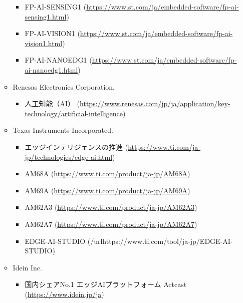 \begin{itemize}
\begin{itemize}
\begin{itemize}
			\item FP-AI-SENSING1 (\url{https://www.st.com/ja/embedded-software/fp-ai-sensing1.html})
			\item FP-AI-VISION1 (\url{https://www.st.com/ja/embedded-software/fp-ai-vision1.html})
			\item FP-AI-NANOEDG1 (\url{https://www.st.com/ja/embedded-software/fp-ai-nanoedg1.html})
		\end{itemize}
		\item Renesas Electronics Corporation.
		\begin{itemize}
			\item 人工知能（AI） (\url{https://www.renesas.com/jp/ja/application/key-technology/artificial-intelligence})
		\end{itemize}
		\item Texas Instruments Incorporated.
		\begin{itemize}
			\item エッジインテリジェンスの推進 (\url{https://www.ti.com/ja-jp/technologies/edge-ai.html})
			\item AM68A (\url{https://www.ti.com/product/ja-jp/AM68A})
			\item AM69A (\url{https://www.ti.com/product/ja-jp/AM69A})
			\item AM62A3 (\url{https://www.ti.com/product/ja-jp/AM62A3})
			\item AM62A7 (\url{https://www.ti.com/product/ja-jp/AM62A7})
			\item EDGE-AI-STUDIO (/url{https://www.ti.com/tool/ja-jp/EDGE-AI-STUDIO})
		\end{itemize}
		\item Idein Inc.
		\begin{itemize}
			\item 国内シェアNo.1 エッジAIプラットフォーム Actcast (\url{https://www.idein.jp/ja})
		\end{itemize}
	\end{itemize}
\end{itemize}

